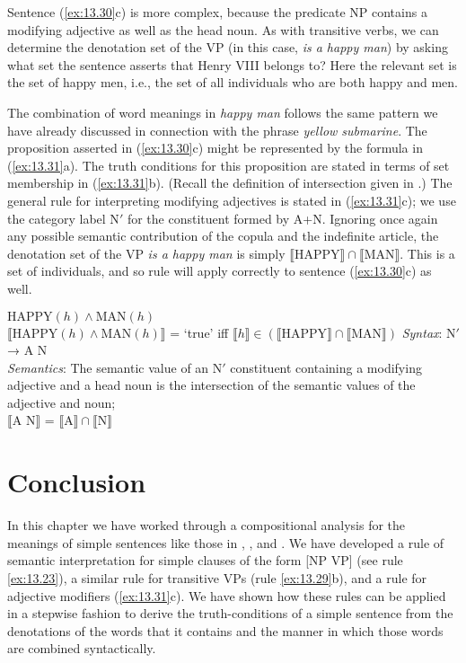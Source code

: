 Sentence (\ref{ex:13.30}c) is more complex, because the predicate NP contains a modifying adjective as well as the head noun. As with transitive verbs, we can determine the denotation set of the VP (in this case, \textit{is a happy man}) by asking what set the sentence asserts that Henry VIII belongs to? Here the relevant set is the set of happy men, i.e., the set of all individuals who are both happy and men.



The combination of word meanings in \textit{happy man} follows the same pattern we have already discussed in connection with the phrase \textit{yellow submarine}. The proposition asserted in (\ref{ex:13.30}c) might be represented by the formula in (\ref{ex:13.31}a). The truth conditions for this proposition are stated in terms of set membership in (\ref{ex:13.31}b). (Recall the definition of intersection given in .) The general rule for interpreting modifying adjectives is stated in (\ref{ex:13.31}c); we use the category label N$'$ for the constituent formed by A+N. Ignoring once again any possible semantic contribution of the copula and the indefinite article, the denotation set of the VP \textit{is a happy man} is simply $\llbracket\text{HAPPY}\rrbracket \cap \llbracket\text{MAN}\rrbracket$. This is a set of individuals, and so rule  will apply correctly to sentence (\ref{ex:13.30}c) as well.


\ea \label{ex:13.31}
\ea  $\text{HAPPY}(h) \wedge \text{MAN}(h)$\\
\ex  $\llbracket\text{HAPPY}(h) \wedge \text{MAN}(h)\rrbracket$  = ‘true’  iff  $\llbracket h\rrbracket \in (\llbracket\text{HAPPY}\rrbracket \cap \llbracket\text{MAN}\rrbracket)$
\ex  \textit{Syntax}: N$'$ →  A N\\
     \textit{Semantics}: The semantic value of an N$'$ constituent containing a modifying adjective and a head noun is the intersection of the semantic values of the adjective and noun;\\
{}$\llbracket\text{A N}\rrbracket$  =  $\llbracket\text{A}\rrbracket \cap \llbracket\text{N}\rrbracket$ 
\z \z

\section{Conclusion}\label{sec:13.6}

In this chapter we have worked through a compositional analysis for the meanings of simple sentences like those in , , and . We have developed a rule of semantic interpretation for simple clauses of the form [NP VP] (see rule \ref{ex:13.23}), a similar rule for transitive VPs (rule \ref{ex:13.29}b), and a rule for adjective modifiers (\ref{ex:13.31}c). We have shown how these rules can be applied in a stepwise fashion to derive the truth-conditions of a simple sentence from the denotations of the words that it contains and the manner in which those words are combined syntactically.



